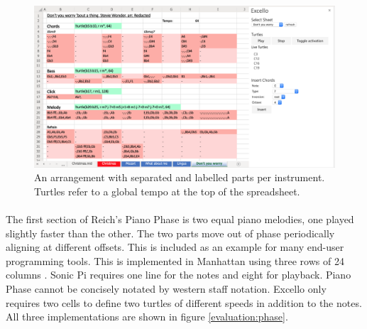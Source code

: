 \begin{figure}[tbh]
\centerline{\includegraphics[width=150mm]{figs/excelloFranzRedacted.png}}
\caption{An arrangement with separated and labelled parts per instrument. Turtles refer to a global tempo at the top of the spreadsheet.}
\label{evaluation:excelloFranzRedacted}
\end{figure}

\paragraph{} The first section of Reich's Piano Phase is two equal piano melodies, one played slightly faster than the other. The two parts move out of phase periodically aligning at different offsets. This is included as an example for many end-user programming tools. This is implemented in Manhattan using three rows of 24 columns \cite{nash:manhattan}. Sonic Pi requires one line for the notes and eight for playback. Piano Phase cannot be concisely notated by western staff notation. Excello only requires two cells to define two turtles of different speeds in addition to the notes. All three implementations are shown in figure \ref{evaluation:phase}.

